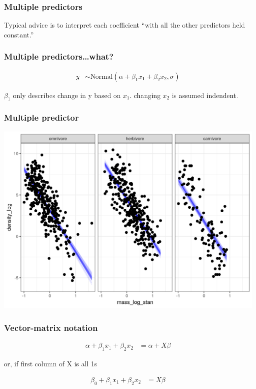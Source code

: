 \documentclass{beamer}
\begin{document}
\begin{frame}
  \frametitle{Multiple predictors}

  \begin{Large}
    Typical advice is to interpret each coefficient ``with all the other predictors held constant.''
  \end{Large}
  
\end{frame}

\begin{frame}
  \frametitle{Multiple predictors\dots what?}
  
  \begin{align*}
    y &\sim \text{Normal}(\alpha + \beta_{1} x_{1} + \beta_{2} x_{2}, \sigma)
  \end{align*}

  \(\beta_{1}\) only describes change in y based on \(x_1\). changing \(x_{2}\) is assumed indendent.
\end{frame}

\begin{frame}
  \frametitle{Multiple predictor}
  \includegraphics[width=\textwidth,height=0.8\textheight,keepaspectratio=true]{multi_fitted-1}
\end{frame}

\begin{frame}
  \frametitle{Vector-matrix notation}

  \begin{align*}
   \alpha + \beta_{1} x_{1} + \beta_{2} x_{2} &= \alpha + X\beta
  \end{align*}

  \begin{center}
    or, if first column of X is all 1s
  \end{center}

  \begin{align*}
    \beta_{0} + \beta_{1} x_{1} + \beta_{2} x_{2} &= X\beta
  \end{align*}
\end{frame}
\end{document}
